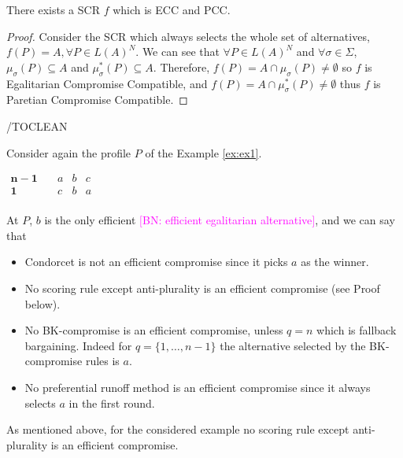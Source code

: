 \documentclass[version=3.21, pagesize, notitlepage, twoside=off, bibliography=totoc, DIV=calc, fontsize=12pt, a4paper]{scrartcl}
\newcommand{\commentBN}[1]{\textcolor{magenta}{\small$\big[$BN: #1$\big]$}}
\newcommand{\musigma}{\mu_{\sigma}}
\newcommand{\mustar}{\mu_{\sigma}^*}
\begin{document}
\begin{proposition}
	There exists a SCR $f$ which is ECC and PCC.
\end{proposition}
\begin{proof}
	Consider the SCR which always selects the whole set of alternatives, $f(P)=A, \forall P \in L(A)^N$. We can see that $\forall P \in L(A)^N$ and $\forall \sigma \in \Sigma$, $\musigma(P) \subseteq A$ and $\mustar(P) \subseteq A$. Therefore, $f(P)=A \cap \musigma(P) \neq \emptyset$ so $f$ is Egalitarian Compromise Compatible, and $f(P)=A \cap \mustar(P) \neq \emptyset$ thus $f$ is Paretian Compromise Compatible.
\end{proof}

\vspace{2cm}
/TOCLEAN

\noindent Consider again the profile $P$ of the Example \ref{ex:ex1}. 
	\begin{center}
		$
		\begin{array}{cccc}
		\mathbf{n-1} \quad &a&b&c\\
		\mathbf{1} \quad &c&b&a\\
		\end{array}
		$
	\end{center}
	At $P$, $b$ is the only efficient \commentBN{efficient egalitarian alternative}, and we can say that 
\begin{itemize}
	\item Condorcet is not an efficient compromise since it picks $a$ as the winner.
	\item No scoring rule except anti-plurality is an efficient compromise (see Proof below).
	\item No BK-compromise is an efficient compromise, unless $q=n$ which is fallback bargaining. Indeed for $q=\{1,\dots, n-1\}$ the alternative selected by the BK-compromise rules is $a$.
	\item No preferential runoff method is an efficient compromise since it always selects $a$ in the first round.
\end{itemize}
As mentioned above, for the considered example no scoring rule except anti-plurality is an efficient compromise.
\end{document}
